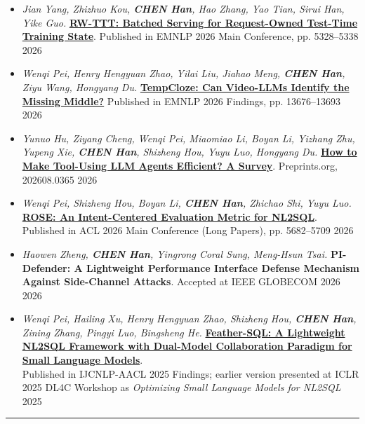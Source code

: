 \documentclass[10pt]{article}
\newenvironment{outerlist}[1][\enskip\textbullet]%
        {%
        \begin{itemize}[label=#1, itemsep=1pt]}{\end{itemize}%
         \vspace{-0.6\baselineskip}}
\begin{document}
\begin{outerlist}
\item \textit{Jian Yang, Zhizhuo Kou, \textbf{CHEN Han}, Hao Zhang, Yao Tian, Sirui Han, Yike Guo.} \href{https://aclanthology.org/2026.emnlp-main.232/}{\textbf{RW-TTT: Batched Serving for Request-Owned Test-Time Training State}}. Published in EMNLP 2026 Main Conference, pp. 5328--5338 \hfill 2026
\item \textit{Wenqi Pei, Henry Hengyuan Zhao, Yilai Liu, Jiahao Meng, \textbf{CHEN Han}, Ziyu Wang, Hongyang Du.} \href{https://aclanthology.org/2026.findings-emnlp.651/}{\textbf{TempCloze: Can Video-LLMs Identify the Missing Middle?}} Published in EMNLP 2026 Findings, pp. 13676--13693 \hfill 2026
\item \textit{Yunuo Hu, Ziyang Cheng, Wenqi Pei, Miaomiao Li, Boyan Li, Yizhang Zhu, Yupeng Xie, \textbf{CHEN Han}, Shizheng Hou, Yuyu Luo, Hongyang Du.} \href{https://www.preprints.org/manuscript/202608.0365}{\textbf{How to Make Tool-Using LLM Agents Efficient? A Survey}}. Preprints.org, 202608.0365 \hfill 2026
\item \textit{Wenqi Pei, Shizheng Hou, Boyan Li, \textbf{CHEN Han}, Zhichao Shi, Yuyu Luo.} \href{https://aclanthology.org/2026.acl-long.257/}{\textbf{ROSE: An Intent-Centered Evaluation Metric for NL2SQL}}. Published in ACL 2026 Main Conference (Long Papers), pp. 5682--5709 \hfill 2026
\item \textit{Haowen Zheng, \textbf{CHEN Han}, Yingrong Coral Sung, Meng-Hsun Tsai.} \textbf{PI-Defender: A Lightweight Performance Interface Defense Mechanism Against Side-Channel Attacks}. Accepted at IEEE GLOBECOM 2026 \hfill 2026
\item \textit{Wenqi Pei, Hailing Xu, Henry Hengyuan Zhao, Shizheng Hou, \textbf{CHEN Han}, Zining Zhang, Pingyi Luo, Bingsheng He.} \href{https://aclanthology.org/2025.findings-ijcnlp.130/}{\textbf{Feather-SQL: A Lightweight NL2SQL Framework with Dual-Model Collaboration Paradigm for Small Language Models}}.\\
Published in IJCNLP-AACL 2025 Findings; earlier version presented at ICLR 2025 DL4C Workshop as \textit{Optimizing Small Language Models for NL2SQL} \hfill 2025
\end{outerlist}
    
\noindent\rule{\textwidth}{1pt}
\end{document}
